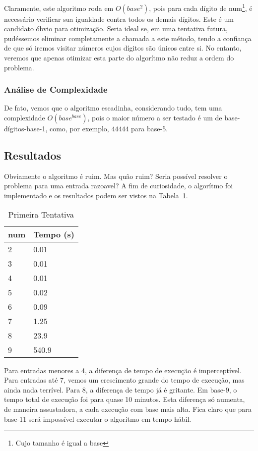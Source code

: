 \documentclass[12pt]{article}
\begin{document}
Claramente, este algoritmo roda em $O(base^{2})$, pois para
cada dígito de {\sf num}\footnote{Cujo tamanho é igual a {\sf base}}, é necessário verificar sua igualdade contra todos
os demais dígitos. Este é um candidato óbvio para otimização. Seria
ideal se, em uma tentativa futura, pudéssemos eliminar completamente
a chamada a este método, tendo a confiança de que só iremos visitar
números cujos dígitos são únicos entre si. No entanto, veremos que apenas otimizar esta parte do algorítmo não reduz a ordem do problema.

\subsubsection{Análise de Complexidade}\label{section:primeira:complexidade}
De fato, vemos que o algoritmo escadinha, considerando tudo, tem uma
complexidade $O(base^{base})$, pois o maior número a ser testado é um de {\sf base}-dígitos-{\sf base-1}, como, por exemplo, $44444$ para base-5.

\subsection{Resultados}\label{section:primeira:resultados}
Obviamente o algoritmo é ruim. Mas quão ruim? Seria possível resolver o problema para uma entrada razoavel? A fim de curiosidade, o algorítmo foi implementado e os resultados podem ser vistos na Tabela~\ref{table:resultados-1}.

\begin{table}[h]
\caption{Primeira Tentativa}
\label{table:resultados-1}
\begin{tabular}{ll}
  {\sf num} & Tempo (s) \\
  \hline
  2 & 0.01 \\
  3 & 0.01 \\
  4 & 0.01 \\
  5 & 0.02 \\
  6 & 0.09 \\
  7 & 1.25 \\
  8 & 23.9 \\
  9 & 540.9    
\end{tabular}
\end{table}

Para entradas menores a 4, a diferença de tempo de execução é imperceptível. Para entradas até 7, vemos um crescimento grande do tempo de execução, mas ainda nada terrível. Para 8, a diferença de tempo já é gritante. Em base-9, o tempo total de execução foi para quase 10 minutos. Esta diferença só aumenta, de maneira assustadora, a cada execução com base mais alta. Fica claro que para base-11 será impossível executar o algorítmo em tempo hábil.
\end{document}
